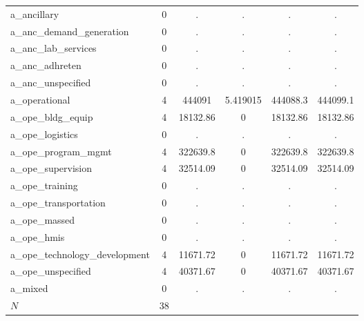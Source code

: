 \begin{table}[htbp]
\begin{tabular}{l*{1}{ccccc}}
a\_ancillary &           0&           .&           .&           .&           .\\
a\_anc\_demand\_generation&           0&           .&           .&           .&           .\\
a\_anc\_lab\_services&           0&           .&           .&           .&           .\\
a\_anc\_adhreten&           0&           .&           .&           .&           .\\
a\_anc\_unspecified&           0&           .&           .&           .&           .\\
a\_operational&           4&      444091&    5.419015&    444088.3&    444099.1\\
a\_ope\_bldg\_equip&           4&    18132.86&           0&    18132.86&    18132.86\\
a\_ope\_logistics&           0&           .&           .&           .&           .\\
a\_ope\_program\_mgmt&           4&    322639.8&           0&    322639.8&    322639.8\\
a\_ope\_supervision&           4&    32514.09&           0&    32514.09&    32514.09\\
a\_ope\_training&           0&           .&           .&           .&           .\\
a\_ope\_transportation&           0&           .&           .&           .&           .\\
a\_ope\_massed&           0&           .&           .&           .&           .\\
a\_ope\_hmis  &           0&           .&           .&           .&           .\\
a\_ope\_technology\_development&           4&    11671.72&           0&    11671.72&    11671.72\\
a\_ope\_unspecified&           4&    40371.67&           0&    40371.67&    40371.67\\
a\_mixed     &           0&           .&           .&           .&           .\\
\hline
\(N\)       &          38&            &            &            &            \\
\hline\hline
\end{tabular}
\end{table}
